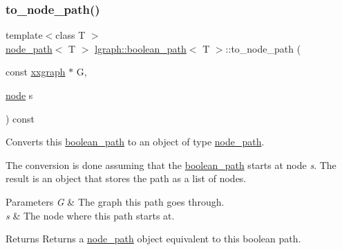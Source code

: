 \subsubsection{\texorpdfstring{to\+\_\+node\+\_\+path()}{to\_node\_path()}\hspace{0.1cm}{\footnotesize\ttfamily [1/2]}}
{\footnotesize\ttfamily template$<$class T $>$ \\
\hyperlink{classlgraph_1_1node__path}{node\+\_\+path}$<$ T $>$ \hyperlink{classlgraph_1_1boolean__path}{lgraph\+::boolean\+\_\+path}$<$ T $>$\+::to\+\_\+node\+\_\+path (\begin{DoxyParamCaption}\item[{const \hyperlink{classlgraph_1_1xxgraph}{xxgraph} $\ast$}]{G,  }\item[{\hyperlink{namespacelgraph_a397169dd66adf725210a30fb7251773e}{node}}]{s }\end{DoxyParamCaption}) const}



Converts this \hyperlink{classlgraph_1_1boolean__path}{boolean\+\_\+path} to an object of type \hyperlink{classlgraph_1_1node__path}{node\+\_\+path}. 

The conversion is done assuming that the \hyperlink{classlgraph_1_1boolean__path}{boolean\+\_\+path} starts at node {\itshape s}. The result is an object that stores the path as a list of nodes.


\begin{DoxyParams}{Parameters}
{\em G} & The graph this path goes through. \\
\hline
{\em s} & The node where this path starts at. \\
\hline
\end{DoxyParams}
\begin{DoxyReturn}{Returns}
Returns a \hyperlink{classlgraph_1_1node__path}{node\+\_\+path} object equivalent to this boolean path. 
\end{DoxyReturn}
\mbox{\label{classlgraph_1_1boolean__path_aee896769bdb13cc9e880e948041c6a6f}} 
